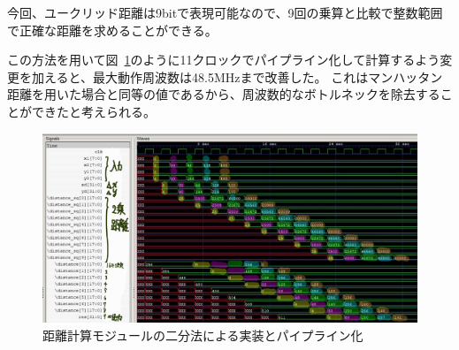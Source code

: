 今回、ユークリッド距離は9bitで表現可能なので、9回の乗算と比較で整数範囲で正確な距離を求めることができる。

この方法を用いて図~\ref{fig:distance_binary}のように11クロックでパイプライン化して計算するよう変更を加えると、最大動作周波数は48.5MHzまで改善した。
これはマンハッタン距離を用いた場合と同等の値であるから、周波数的なボトルネックを除去することができたと考えられる。


\begin{figure}
    \begin{center}
        \includegraphics[width=15cm]{figure/distance_binary.jpg}
        \caption{距離計算モジュールの二分法による実装とパイプライン化}\label{fig:distance_binary}
    \end{center}
\end{figure}

